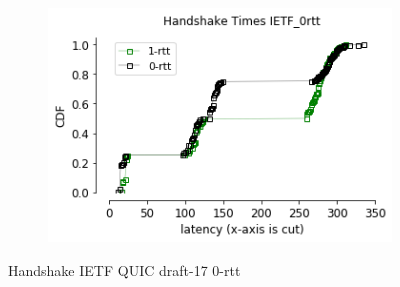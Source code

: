 \begin{frame}
\begin{figure}[!t]
    \centering
    \begin{subfigure}{0.4\textwidth}
        \includegraphics[width=\linewidth]
        {./plots/VM/ietf/handshake_times_ietf_0rtt.png}
    \end{subfigure}
    \caption{\label{fig:handshake_times_0rtt_ipv4}Handshake IETF QUIC draft-17 0-rtt}
\end{figure}

\end{frame}
\clearpage

